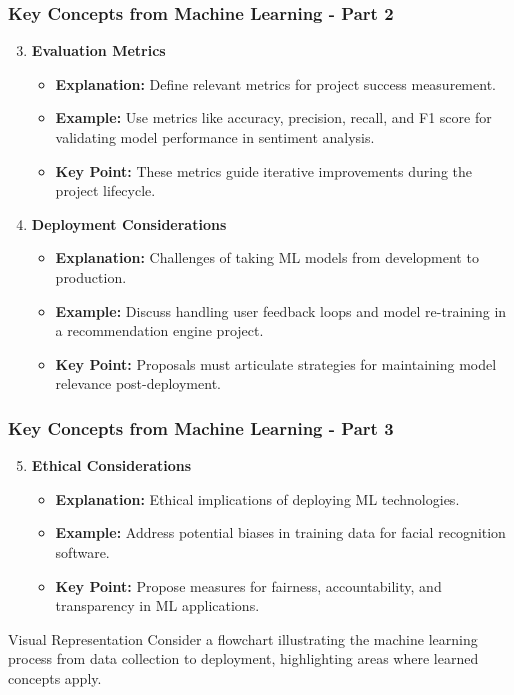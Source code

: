 \documentclass[aspectratio=169]{beamer}
\begin{document}
\begin{frame}[fragile]
    \frametitle{Key Concepts from Machine Learning - Part 2}
    \begin{enumerate}
        \setcounter{enumi}{2} %
        \item \textbf{Evaluation Metrics}
        \begin{itemize}
            \item \textbf{Explanation:} Define relevant metrics for project success measurement.
            \item \textbf{Example:} Use metrics like accuracy, precision, recall, and F1 score for validating model performance in sentiment analysis.
            \item \textbf{Key Point:} These metrics guide iterative improvements during the project lifecycle.
        \end{itemize}

        \item \textbf{Deployment Considerations}
        \begin{itemize}
            \item \textbf{Explanation:} Challenges of taking ML models from development to production.
            \item \textbf{Example:} Discuss handling user feedback loops and model re-training in a recommendation engine project.
            \item \textbf{Key Point:} Proposals must articulate strategies for maintaining model relevance post-deployment.
        \end{itemize}
    \end{enumerate}
\end{frame}

\begin{frame}[fragile]
    \frametitle{Key Concepts from Machine Learning - Part 3}
    \begin{enumerate}
        \setcounter{enumi}{4} %
        \item \textbf{Ethical Considerations}
        \begin{itemize}
            \item \textbf{Explanation:} Ethical implications of deploying ML technologies.
            \item \textbf{Example:} Address potential biases in training data for facial recognition software.
            \item \textbf{Key Point:} Propose measures for fairness, accountability, and transparency in ML applications.
        \end{itemize}
    \end{enumerate}
    
    \begin{block}{Visual Representation}
        Consider a flowchart illustrating the machine learning process from data collection to deployment, highlighting areas where learned concepts apply.
    \end{block}
\end{frame}
\end{document}
